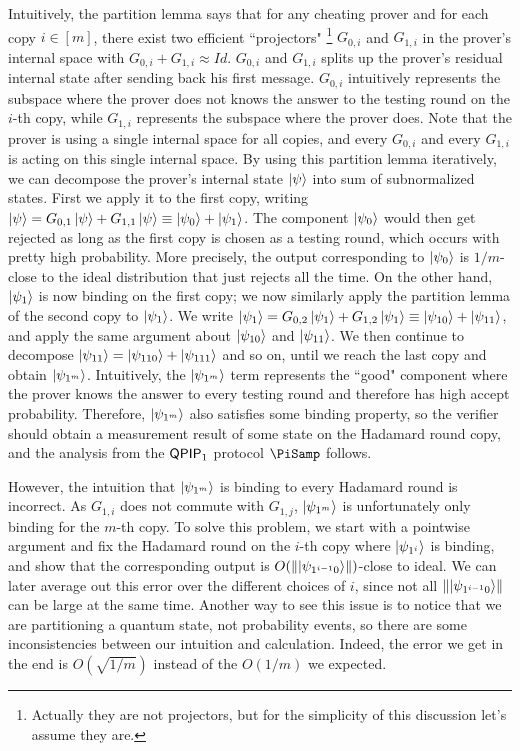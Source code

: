Intuitively, the partition lemma says that for any cheating prover and for each copy $i\in[m]$, there exist two efficient ``projectors" \footnote{Actually they are not projectors, but for the simplicity of this discussion let's assume they are.} $G_{0,i}$ and $G_{1,i}$ in the prover's internal space with $G_{0,i}+G_{1,i} \approx Id$. $G_{0,i}$ and $G_{1,i}$ splits up the prover's residual internal state after sending back his first message.
$G_{0,i}$ intuitively represents the subspace where the prover does not knows the answer to the testing round on the $i$-th copy, while $G_{1,i}$ represents the subspace where the prover does. Note that the prover is using a single internal space for all copies, and every $G_{0,i}$ and every $G_{1,i}$ is acting on this single internal space. 
By using this partition lemma iteratively, we can decompose the prover's internal state $\ket{\psi}$ into sum of subnormalized states.
First we apply it to the first copy, writing $\ket{\psi}=G_{0,1}\ket{\psi}+G_{1,1}\ket{\psi} \equiv \ket{\psi_0}+\ket{\psi_1}$.
The component $\ket{\psi_0}$ would then get rejected as long as the first copy is chosen as a testing round,
which occurs with pretty high probability.
More precisely, the output corresponding to $\ket{\psi_0}$ is $1/m$-close to the ideal distribution that just rejects all the time.
On the other hand, $\ket{\psi_1}$ is now binding on the first copy;
we now similarly apply the partition lemma of the second copy to $\ket{\psi_1}$.
We write $\ket{\psi_1}=G_{0,2}\ket{\psi_1}+G_{1,2}\ket{\psi_1}\equiv \ket{\psi_{10}}+\ket{\psi_{11}}$, and apply the same argument about $\ket{\psi_{10}}$ and $\ket{\psi_{11}}$.
We then continue to decompose $\ket{\psi_{11}}=\ket{\psi_{110}}+\ket{\psi_{111}}$ and so on, until we reach the last copy and obtain $\ket{\psi_{1^m}}$.
Intuitively, the $\ket{\psi_{1^m}}$ term represents the ``good" component where the prover knows the answer to every testing round and therefore has high accept probability. Therefore, $\ket{\psi_{1^m}}$ also satisfies some binding property,
so the verifier should obtain a measurement result of some state on the Hadamard round copy,
and the analysis from the $\operatorname{\mathsf{QPIP}}_1$ protocol $\PiSamp$ follows.

However, the intuition that $\ket{\psi_{1^m}}$ is binding to every Hadamard round is incorrect. As $G_{1,i}$ does not commute with $G_{1,j}$, $\ket{\psi_{1^m}}$ is unfortunately only binding for the $m$-th copy.
To solve this problem, we start with a pointwise argument and fix the Hadamard round on the $i$-th copy where $\ket{\psi_{1^i}}$ is binding,
and show that the corresponding output is $O(\left\lVert\ket{\psi_{1^{i-1}0}}\right\rVert)$-close to ideal.
We can later average out this error over the different choices of $i$, since not all $\left\lVert\ket{\psi_{1^{i-1}0}}\right\rVert$ can be large at the same time. Another way to see this issue is to notice that we are partitioning a quantum state, not probability events, so there are some inconsistencies between our intuition and calculation. Indeed, the error we get in the end is $O(\sqrt{1/m})$ instead of the $O(1/m)$ we expected. 

